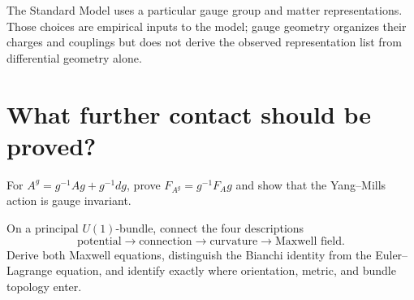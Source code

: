 The Standard Model uses a particular gauge group and matter representations.
Those choices are empirical inputs to the model; gauge geometry organizes
their charges and couplings but does not derive the observed representation
list from differential geometry alone.

\section{What further contact should be proved?}

\begin{exercise}
For $A^g=g^{-1}Ag+g^{-1}dg$, prove
$F_{A^g}=g^{-1}F_Ag$ and show that the Yang--Mills action is gauge invariant.
\end{exercise}

\begin{exercise}
On a principal $U(1)$-bundle, connect the four descriptions
\[
\text{potential}\longrightarrow\text{connection}\longrightarrow
\text{curvature}\longrightarrow\text{Maxwell field}.
\]
Derive both Maxwell equations, distinguish the Bianchi identity from the
Euler--Lagrange equation, and identify exactly where orientation, metric, and
bundle topology enter.
\end{exercise}

